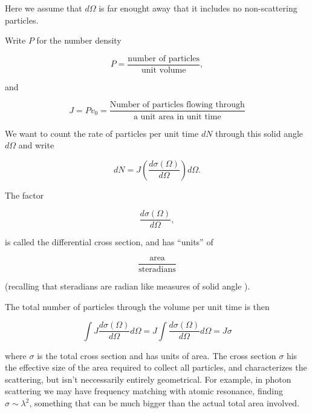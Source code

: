 Here we assume that $d\Omega$ is far enought away that it includes no non-scattering particles.

Write $P$ for the number density

\begin{equation}\label{eqn:qmTwoL23:680}
P = \frac{\text{number of particles}}{\text{unit volume}},
\end{equation}

and

\begin{equation}\label{eqn:qmTwoL23:700}
J = P v_0 =
\frac{
\text{Number of particles flowing through}
}{
\text{a unit area in unit time}
}
\end{equation}

We want to count the rate of particles per unit time $dN$ through this solid angle $d\Omega$ and write

\begin{equation}\label{eqn:qmTwoL23:720}
dN = J \left( \frac{d \sigma(\Omega)}{d\Omega} \right) d\Omega.
\end{equation}

The factor

\begin{equation}\label{eqn:qmTwoL23:740}
\frac{d \sigma(\Omega)}{d\Omega},
\end{equation}

is called the differential cross section, and has ``units'' of

\begin{equation}\label{eqn:qmTwoL23:760}
\frac{\text{area}}{\text{steradians}}
\end{equation}

(recalling that steradians are radian like measures of solid angle \cite{wiki:steradian}).

The total number of particles through the volume per unit time is then

\begin{equation}\label{eqn:qmTwoL23:780}
\int J \frac{d \sigma(\Omega)}{d\Omega} d\Omega
= J \int \frac{d \sigma(\Omega)}{d\Omega} d\Omega
= J \sigma
\end{equation}

where $\sigma$ is the total cross section and has units of area.  The cross section $\sigma$ his the effective size of the area required to collect all particles, and characterizes the scattering, but isn't neccessarily entirely geometrical.  For example, in photon scattering we may have frequency matching with atomic resonance, finding $\sigma \sim \lambda^2$, something that can be much bigger than the actual total area involved.


